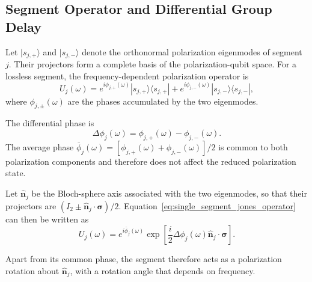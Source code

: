 
\subsection{Segment Operator and Differential Group Delay}
\label{subsec:single_segment_operator_and_dgd}

Let \(|s_{j,+}\rangle\) and \(|s_{j,-}\rangle\) denote the orthonormal
polarization eigenmodes of segment \(j\). Their projectors form a complete
basis of the polarization-qubit space. For a lossless segment, the
frequency-dependent polarization operator is
%
\begin{equation}
    U_j(\omega)
    =
    e^{i\phi_{j,+}(\omega)}
    |s_{j,+}\rangle\langle s_{j,+}|
    +
    e^{i\phi_{j,-}(\omega)}
    |s_{j,-}\rangle\langle s_{j,-}|,
    \label{eq:single_segment_jones_operator}
\end{equation}
%
where \(\phi_{j,\pm}(\omega)\) are the phases accumulated by the two
eigenmodes.

The differential phase is
%
\begin{equation}
    \Delta\phi_j(\omega)
    =
    \phi_{j,+}(\omega)
    -
    \phi_{j,-}(\omega).
    \label{eq:single_segment_differential_phase}
\end{equation}
%
The average phase
\(\overline{\phi}_j(\omega)
=[\phi_{j,+}(\omega)+\phi_{j,-}(\omega)]/2\)
is common to both polarization components and therefore does not affect the
reduced polarization state.

Let \(\widehat{\mathbf n}_j\) be the Bloch-sphere axis associated with the
two eigenmodes, so that their projectors are
\((I_2\pm\widehat{\mathbf n}_j\cdot\boldsymbol{\sigma})/2\).
Equation~\eqref{eq:single_segment_jones_operator} can then be written as
%
\begin{equation}
    U_j(\omega)
    =
    e^{i\overline{\phi}_j(\omega)}
    \exp
    \left[
        \frac{i}{2}
        \Delta\phi_j(\omega)
        \widehat{\mathbf n}_j
        \cdot
        \boldsymbol{\sigma}
    \right].
    \label{eq:single_segment_pauli_exponential}
\end{equation}

Apart from its common phase, the segment therefore acts as a polarization
rotation about \(\widehat{\mathbf n}_j\), with a rotation angle that depends
on frequency.

\medskip

